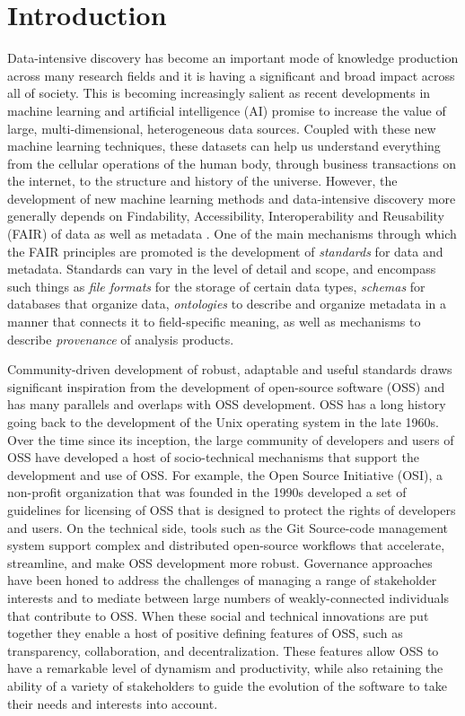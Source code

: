 \documentclass[
  number]{elsarticle}
\begin{document}
\section{Introduction}\label{sec-intro}

Data-intensive discovery has become an important mode of knowledge
production across many research fields and it is having a significant
and broad impact across all of society. This is becoming increasingly
salient as recent developments in machine learning and artificial
intelligence (AI) promise to increase the value of large,
multi-dimensional, heterogeneous data sources. Coupled with these new
machine learning techniques, these datasets can help us understand
everything from the cellular operations of the human body, through
business transactions on the internet, to the structure and history of
the universe. However, the development of new machine learning methods
and data-intensive discovery more generally depends on Findability,
Accessibility, Interoperability and Reusability (FAIR) of data
\citep{Wilkinson2016FAIR} as well as metadata \citep{Musen2022metadata}.
One of the main mechanisms through which the FAIR principles are
promoted is the development of \emph{standards} for data and metadata.
Standards can vary in the level of detail and scope, and encompass such
things as \emph{file formats} for the storage of certain data types,
\emph{schemas} for databases that organize data, \emph{ontologies} to
describe and organize metadata in a manner that connects it to
field-specific meaning, as well as mechanisms to describe
\emph{provenance} of analysis products.

Community-driven development of robust, adaptable and useful standards
draws significant inspiration from the development of open-source
software (OSS) and has many parallels and overlaps with OSS development.
OSS has a long history going back to the development of the Unix
operating system in the late 1960s. Over the time since its inception,
the large community of developers and users of OSS have developed a host
of socio-technical mechanisms that support the development and use of
OSS. For example, the Open Source Initiative (OSI), a non-profit
organization that was founded in the 1990s developed a set of guidelines
for licensing of OSS that is designed to protect the rights of
developers and users. On the technical side, tools such as the Git
Source-code management system support complex and distributed
open-source workflows that accelerate, streamline, and make OSS
development more robust. Governance approaches have been honed to
address the challenges of managing a range of stakeholder interests and
to mediate between large numbers of weakly-connected individuals that
contribute to OSS. When these social and technical innovations are put
together they enable a host of positive defining features of OSS, such
as transparency, collaboration, and decentralization. These features
allow OSS to have a remarkable level of dynamism and productivity, while
also retaining the ability of a variety of stakeholders to guide the
evolution of the software to take their needs and interests into
account.
\end{document}
